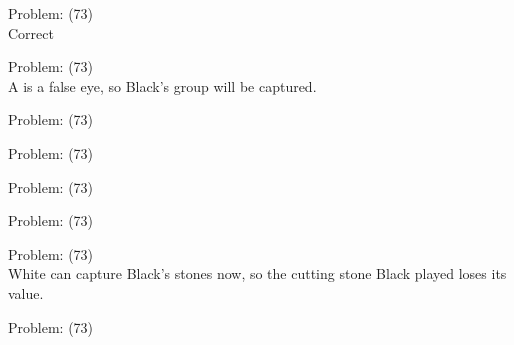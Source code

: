 \documentclass[11pt]{article}
\begin{document}
\begin{minipage}[t]{0.5\textwidth}
  {\centering
  
Problem: (73)\\
Correct\\
  }
\end{minipage}
\begin{minipage}[t]{0.5\textwidth}
  {\centering
  
Problem: (73)\\
A is a false eye, so Black's group will be captured.\\
  }
\end{minipage}
\begin{minipage}[t]{0.5\textwidth}
  {\centering
  
Problem: (73)\\
  }
\end{minipage}
\begin{minipage}[t]{0.5\textwidth}
  {\centering
  
Problem: (73)\\
  }
\end{minipage}
\begin{minipage}[t]{0.5\textwidth}
  {\centering
  
Problem: (73)\\
  }
\end{minipage}
\begin{minipage}[t]{0.5\textwidth}
  {\centering
  
Problem: (73)\\
  }
\end{minipage}
\begin{minipage}[t]{0.5\textwidth}
  {\centering
  
Problem: (73)\\
White can capture Black's stones now, so the cutting stone Black played loses its value.\\
  }
\end{minipage}
\begin{minipage}[t]{0.5\textwidth}
  {\centering
  
Problem: (73)\\
  }
\end{minipage}
\end{document}
